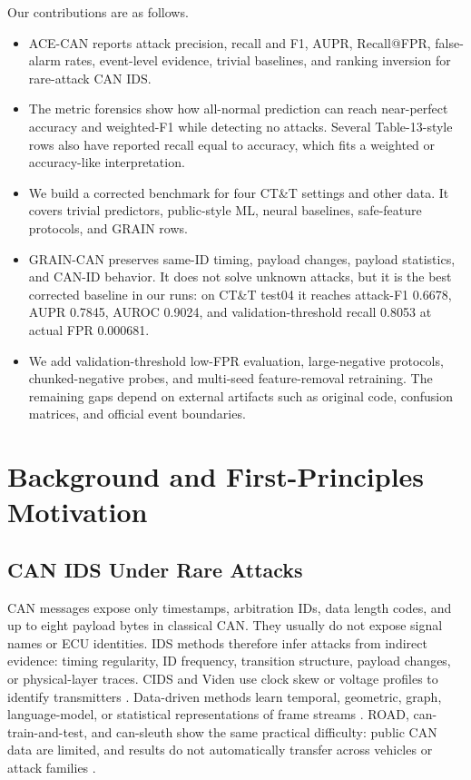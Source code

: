 \documentclass[runningheads]{llncs}
\newcommand{\method}{GRAIN-CAN}
\newcommand{\framework}{ACE-CAN}
\begin{document}
Our contributions are as follows.
\begin{itemize}
    \item \framework{} reports attack precision, recall and F1, AUPR, Recall@FPR, false-alarm rates, event-level evidence, trivial baselines, and ranking inversion for rare-attack CAN IDS.
    \item The metric forensics show how all-normal prediction can reach near-perfect accuracy and weighted-F1 while detecting no attacks.  Several Table-13-style rows also have reported recall equal to accuracy, which fits a weighted or accuracy-like interpretation.
    \item We build a corrected benchmark for four CT\&T settings and other data.  It covers trivial predictors, public-style ML, neural baselines, safe-feature protocols, and GRAIN rows.
    \item \method{} preserves same-ID timing, payload changes, payload statistics, and CAN-ID behavior.  It does not solve unknown attacks, but it is the best corrected baseline in our runs: on CT\&T test04 it reaches attack-F1 0.6678, AUPR 0.7845, AUROC 0.9024, and validation-threshold recall 0.8053 at actual FPR 0.000681.
    \item We add validation-threshold low-FPR evaluation, large-negative protocols, chunked-negative probes, and multi-seed feature-removal retraining.  The remaining gaps depend on external artifacts such as original code, confusion matrices, and official event boundaries.
\end{itemize}

\section{Background and First-Principles Motivation}
\subsection{CAN IDS Under Rare Attacks}
CAN messages expose only timestamps, arbitration IDs, data length codes, and up to eight payload bytes in classical CAN.  They usually do not expose signal names or ECU identities.  IDS methods therefore infer attacks from indirect evidence: timing regularity, ID frequency, transition structure, payload changes, or physical-layer traces.  CIDS and Viden use clock skew or voltage profiles to identify transmitters \cite{cho2016fingerprinting,cho2017viden}.  Data-driven methods learn temporal, geometric, graph, language-model, or statistical representations of frame streams \cite{tyree2018shape,verma2020road,alkhatib2022canbert,wang2023statgraph}.  ROAD, can-train-and-test, and can-sleuth show the same practical difficulty: public CAN data are limited, and results do not automatically transfer across vehicles or attack families \cite{verma2020road,lampe2024ctt,kidmose2025cansleuth}.
\end{document}

